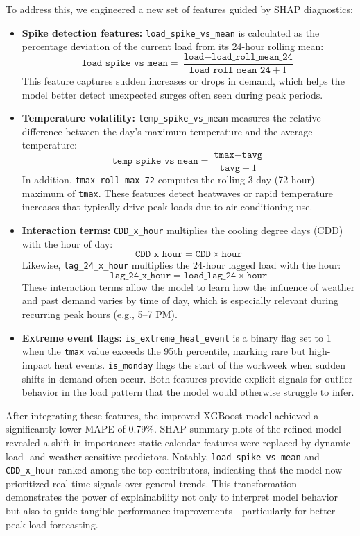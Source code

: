 \documentclass{ifacconf}
\begin{document}
To address this, we engineered a new set of features guided by SHAP diagnostics:
\begin{itemize}
    \item \textbf{Spike detection features:} \texttt{load\_spike\_vs\_mean} is calculated as the percentage deviation of the current load from its 24-hour rolling mean:
    \[
        \texttt{load\_spike\_vs\_mean} = \frac{\texttt{load} - \texttt{load\_roll\_mean\_24}}{\texttt{load\_roll\_mean\_24} + 1}
    \]
    This feature captures sudden increases or drops in demand, which helps the model better detect unexpected surges often seen during peak periods.

    \item \textbf{Temperature volatility:} \texttt{temp\_spike\_vs\_mean} measures the relative difference between the day's maximum temperature and the average temperature:
    \[
        \texttt{temp\_spike\_vs\_mean} = \frac{\texttt{tmax} - \texttt{tavg}}{\texttt{tavg} + 1}
    \]
    In addition, \texttt{tmax\_roll\_max\_72} computes the rolling 3-day (72-hour) maximum of \texttt{tmax}. These features detect heatwaves or rapid temperature increases that typically drive peak loads due to air conditioning use.

    \item \textbf{Interaction terms:} \texttt{CDD\_x\_hour} multiplies the cooling degree days (CDD) with the hour of day:
    \[
        \texttt{CDD\_x\_hour} = \texttt{CDD} \times \texttt{hour}
    \]
    Likewise, \texttt{lag\_24\_x\_hour} multiplies the 24-hour lagged load with the hour:
    \[
        \texttt{lag\_24\_x\_hour} = \texttt{load\_lag\_24} \times \texttt{hour}
    \]
    These interaction terms allow the model to learn how the influence of weather and past demand varies by time of day, which is especially relevant during recurring peak hours (e.g., 5–7 PM).

    \item \textbf{Extreme event flags:} \texttt{is\_extreme\_heat\_event} is a binary flag set to 1 when the \texttt{tmax} value exceeds the 95th percentile, marking rare but high-impact heat events. \texttt{is\_monday} flags the start of the workweek when sudden shifts in demand often occur. Both features provide explicit signals for outlier behavior in the load pattern that the model would otherwise struggle to infer.
\end{itemize}


After integrating these features, the improved XGBoost model achieved a significantly lower MAPE of 0.79\%. SHAP summary plots of the refined model revealed a shift in importance: static calendar features were replaced by dynamic load- and weather-sensitive predictors. Notably, \texttt{load\_spike\_vs\_mean} and \texttt{CDD\_x\_hour} ranked among the top contributors, indicating that the model now prioritized real-time signals over general trends. This transformation demonstrates the power of explainability not only to interpret model behavior but also to guide tangible performance improvements—particularly for better peak load forecasting.
\end{document}
